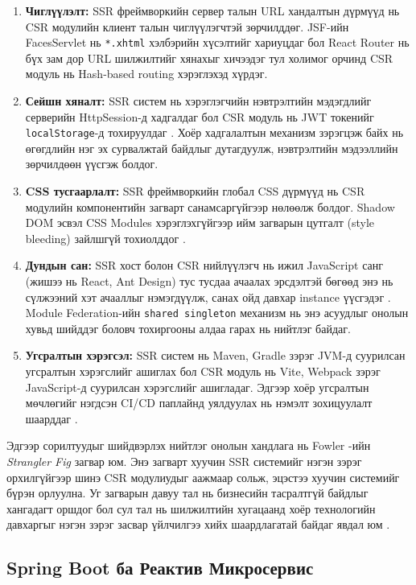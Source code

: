 \begin{enumerate}
  \item \textbf{Чиглүүлэлт:} SSR фреймворкийн сервер талын URL хандалтын дүрмүүд нь CSR модулийн клиент талын чиглүүлэгчтэй зөрчилддөг. JSF-ийн FacesServlet нь \texttt{*.xhtml} хэлбэрийн хүсэлтийг хариуцдаг бол React Router нь бүх зам дор URL шилжилтийг хянахыг хичээдэг \cite{jackson2019} тул холимог орчинд CSR модуль нь Hash-based routing хэрэглэхэд хүрдэг.
  \item \textbf{Сейшн хяналт:} SSR систем нь хэрэглэгчийн нэвтрэлтийн мэдэгдлийг серверийн HttpSession-д хадгалдаг бол CSR модуль нь JWT токенийг \texttt{localStorage}-д тохируулдаг \cite{mannisto2023}. Хоёр хадгалалтын механизм зэрэгцэж байх нь өгөгдлийн нэг эх сурвалжтай байдлыг дутагдуулж, нэвтрэлтийн мэдээллийн зөрчилдөөн үүсгэж болдог.
  \item \textbf{CSS тусгаарлалт:} SSR фреймворкийн глобал CSS дүрмүүд нь CSR модулийн компонентийн загварт санамсаргүйгээр нөлөөлж болдог. Shadow DOM эсвэл CSS Modules хэрэглэхгүйгээр ийм загварын цутгалт (style bleeding) зайлшгүй тохиолддог \cite{taibi2022}.
  \item \textbf{Дундын сан:} SSR хост болон CSR нийлүүлэгч нь ижил JavaScript санг (жишээ нь React, Ant Design) тус тусдаа ачаалах эрсдэлтэй бөгөөд энэ нь сүлжээний хэт ачааллыг нэмэгдүүлж, санах ойд давхар instance үүсгэдэг \cite{ameer2024}. Module Federation-ийн \texttt{shared singleton} механизм нь энэ асуудлыг онолын хувьд шийддэг боловч тохиргооны алдаа гарах нь нийтлэг байдаг.
  \item \textbf{Угсралтын хэрэгсэл:} SSR систем нь Maven, Gradle зэрэг JVM-д суурилсан угсралтын хэрэгслийг ашиглах бол CSR модуль нь Vite, Webpack зэрэг JavaScript-д суурилсан хэрэгслийг ашигладаг. Эдгээр хоёр угсралтын мөчлөгийг нэгдсэн CI/CD паплайнд уялдуулах нь нэмэлт зохицуулалт шаарддаг \cite{bjelotomic2024}.
\end{enumerate}

Эдгээр сорилтуудыг шийдвэрлэх нийтлэг онолын хандлага нь Fowler \cite{fowler_strangler}-ийн \textit{Strangler Fig} загвар юм. Энэ загварт хуучин SSR системийг нэгэн зэрэг орхилгүйгээр шинэ CSR модулиудыг аажмаар сольж, эцэстээ хуучин системийг бүрэн орлуулна. Уг загварын давуу тал нь бизнесийн тасралтгүй байдлыг хангадагт оршдог бол сул тал нь шилжилтийн хугацаанд хоёр технологийн давхаргыг нэгэн зэрэг засвар үйлчилгээ хийх шаардлагатай байдаг явдал юм \cite{silva2024}.

% 
\subsection{Spring Boot ба Реактив Микросервис}


